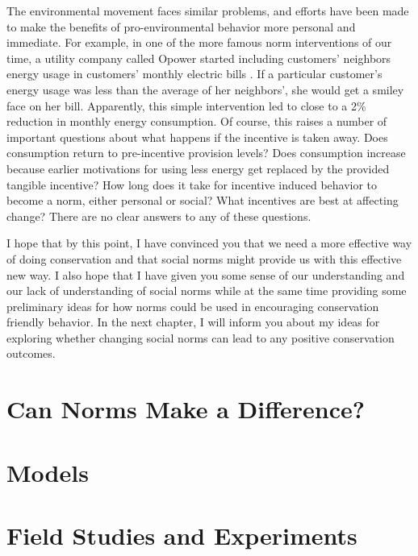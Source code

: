 \documentclass[rutwik_proposal.tex]{subfiles}
\begin{document}
The environmental movement faces similar problems, and efforts have been made to make the benefits of pro-environmental behavior more personal and immediate. For example, in one of the more famous norm interventions of our time, a utility company called Opower started including customers' neighbors energy usage in customers' monthly electric bills \cite{Allcott11}. If a particular customer's energy usage was less than the average of her neighbors', she would get a smiley face on her bill. Apparently, this simple intervention led to close to a 2\% reduction in monthly energy consumption. Of course, this raises a number of important questions about what happens if the incentive is taken away. Does consumption return to pre-incentive provision levels? Does consumption increase because earlier motivations for using less energy get replaced by the provided tangible incentive? How long does it take for incentive induced behavior to become a norm, either personal or social? What incentives are best at affecting change? There are no clear answers to any of these questions.

I hope that by this point, I have convinced you that we need a more effective way of doing conservation and that social norms might provide us with this effective new way. I also hope that I have given you some sense of our understanding and our lack of understanding of social norms while at the same time providing some preliminary ideas for how norms could be used in encouraging conservation friendly behavior. In the next chapter, I will inform you about my ideas for exploring whether changing social norms can lead to any positive conservation outcomes.

\chapter{Can Norms Make a Difference?}\label{ch:usefulness}

\chapter{Models}\label{ch:models}

\chapter{Field Studies and Experiments}\label{ch:field}
\end{document}
